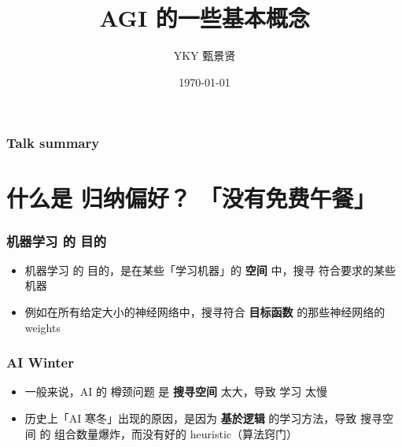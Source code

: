 \documentclass[17pt]{beamer}
\title[China AGI group]{AGI 的一些基本概念} %
\author{YKY 甄景贤} %
\institute[] %
{
Independent researcher, Hong Kong \\ %
\medskip
\textit{generic.intelligence@gmail.com} %
}
\date{\today} %
\begin{document}
\frame{\titlepage}

\begin{frame}
\frametitle{Talk summary}
\tableofcontents
\end{frame}

%
%




\section[Section]
{\texorpdfstring{什么是 归纳偏好？
\protect\linebreak[1] 「没有免费午餐」}
{什么是 归纳偏好？「没有免费午餐」}}
\frame{\sectionpage}

\begin{frame}
\frametitle{机器学习 的 目的}
\begin{itemize}
	\item 机器学习 的 目的，是在某些「学习机器」的 \textbf{空间} 中，搜寻 符合要求的某些机器
	\item 例如在所有给定大小的神经网络中，搜寻符合 \textbf{目标函数} 的那些神经网络的 weights
\end{itemize}
\end{frame}

\begin{frame}
\frametitle{AI Winter}
\begin{itemize}
	\item 一般来说，AI 的 樽颈问题 是 {\color{red}\textbf{搜寻空间} 太大}，导致 学习 太慢
	\item 历史上「AI 寒冬」出现的原因，是因为 \textbf{基於逻辑} 的学习方法，导致 搜寻空间 的 组合数量爆炸，而没有好的 heuristic（算法窍门）
\end{itemize}
\end{frame}
\end{document}
